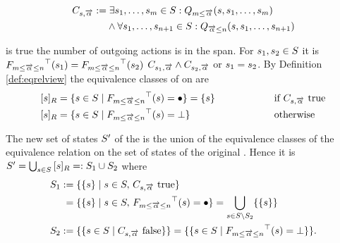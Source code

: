 \documentclass[preview]{standalone}
\begin{document}
\begin{align*}
	\formoutact:= &\;\exists \state_1, \dots, \state_\numoutactb \in \states: \predminoutact[\numoutactb] \\
	&\land \forall \state_1, \dots, \state_{\numoutact+1} \in \states: \predmaxoutact
\end{align*}

\formoutact is true \iffN the number of outgoing actions is in the span. For $\state_1, \state_2 \in \states$ it is $\gfctspanoutaction(\state_1) = \gfctspanoutaction(\state_2)$ \iffN $\formoutact[\state_1] \land \formoutact[\state_2]$ or $\state_1 = \state_2$. By Definition \ref{def:eqrelview} the equivalence classes of \eqrelview on \states are 
\begin{alignat*}{3}
	\eqclassv &= \{\state \in \states \mid \gfctspanoutaction(\state) = \remelem\} = \{\state\} \quad\quad\quad\quad\quad &&\text{if } \formoutact \text{ true} \\
	\eqclassv &= \{\state \in \states \mid \gfctspanoutaction(\state) = \notppty\} &&\text{otherwise}	
\end{alignat*}

The new set of states $\states'$ of the \viewN \viewspanoutaction is the union of the equivalence classes of the equivalence relation \eqrelview on the set of states \states of the original \chgphN. Hence it is $\states' = \bigcup_{\state \in \states} \eqclassv =: \states_1 \cup \states_2$ where
\begin{align*}
	\states_1 &:= \{\{\state\} \mid \state \in \states, \, \formoutact \text{ true}\} \\
	&\;= \{\{\state\} \mid \state \in \states, \, \gfctspanoutaction(\state) = \remelem\} = \nogroupstates \\
	\states_2 &:= \{\{\state \in \states \mid \formoutact \text{ false}\}\} = \{\{\state \in \states \mid \gfctspanoutaction(\state) = \notppty\}\}.
\end{align*}
\end{document}
